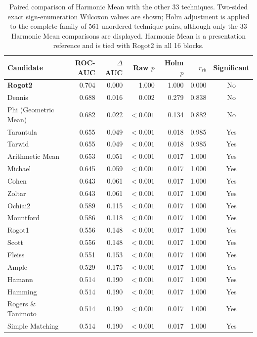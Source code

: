 \begin{table}[t]
\centering
\caption{Paired comparison of Harmonic Mean with the other 33 techniques. Two-sided exact sign-enumeration Wilcoxon values are shown; Holm adjustment is applied to the complete family of 561 unordered technique pairs, although only the 33 Harmonic Mean comparisons are displayed. Harmonic Mean is a presentation reference and is tied with Rogot2 in all 16 blocks.}
\label{tab:rq1-reference-comparisons-exact}
{\scriptsize
\setlength{\tabcolsep}{3pt}
\begin{tabular}{lrrrrrc}
\toprule
Candidate & ROC-AUC & $\Delta$AUC & Raw $p$ & Holm $p$ & $r_{rb}$ & Significant \\
\midrule
\textbf{Rogot2} & 0.704 & 0.000 & 1.000 & 1.000 & 0.000 & No \\
Dennis & 0.688 & 0.016 & 0.002 & 0.279 & 0.838 & No \\
Phi (Geometric Mean) & 0.682 & 0.022 & $<0.001$ & 0.134 & 0.882 & No \\
Tarantula & 0.655 & 0.049 & $<0.001$ & 0.018 & 0.985 & Yes \\
Tarwid & 0.655 & 0.049 & $<0.001$ & 0.018 & 0.985 & Yes \\
Arithmetic Mean & 0.653 & 0.051 & $<0.001$ & 0.017 & 1.000 & Yes \\
Michael & 0.645 & 0.059 & $<0.001$ & 0.017 & 1.000 & Yes \\
Cohen & 0.643 & 0.061 & $<0.001$ & 0.017 & 1.000 & Yes \\
Zoltar & 0.643 & 0.061 & $<0.001$ & 0.017 & 1.000 & Yes \\
Ochiai2 & 0.589 & 0.115 & $<0.001$ & 0.017 & 1.000 & Yes \\
Mountford & 0.586 & 0.118 & $<0.001$ & 0.017 & 1.000 & Yes \\
Rogot1 & 0.556 & 0.148 & $<0.001$ & 0.017 & 1.000 & Yes \\
Scott & 0.556 & 0.148 & $<0.001$ & 0.017 & 1.000 & Yes \\
Fleiss & 0.551 & 0.153 & $<0.001$ & 0.017 & 1.000 & Yes \\
Ample & 0.529 & 0.175 & $<0.001$ & 0.017 & 1.000 & Yes \\
Hamann & 0.514 & 0.190 & $<0.001$ & 0.017 & 1.000 & Yes \\
Hamming & 0.514 & 0.190 & $<0.001$ & 0.017 & 1.000 & Yes \\
Rogers \& Tanimoto & 0.514 & 0.190 & $<0.001$ & 0.017 & 1.000 & Yes \\
Simple Matching & 0.514 & 0.190 & $<0.001$ & 0.017 & 1.000 & Yes \\

\end{tabular}}
\end{table}
